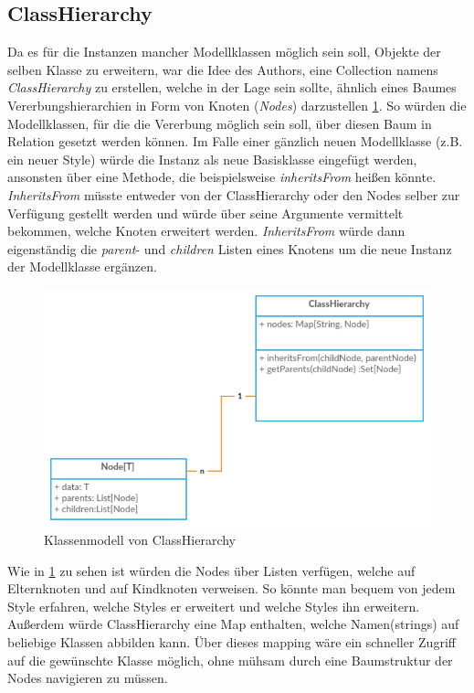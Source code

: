\subsection{ClassHierarchy}Da es für die Instanzen mancher Modellklassen möglich sein soll, Objekte der selben Klasse zu erweitern, war die Idee des Authors, eine Collection namens \textit{ClassHierarchy} zu erstellen, welche in der Lage sein sollte, ähnlich eines Baumes Vererbungshierarchien in Form von Knoten (\textit{Nodes}) darzustellen  \ref{classhierarchy}. So würden die Modellklassen, für die die Vererbung möglich sein soll, über diesen Baum in Relation gesetzt werden können. Im Falle einer gänzlich neuen Modellklasse (z.B. ein neuer Style) würde die Instanz als neue Basisklasse eingefügt werden, ansonsten über eine Methode, die beispielsweise \textit{inheritsFrom} heißen könnte. \textit{InheritsFrom} müsste entweder von der ClassHierarchy oder den Nodes selber zur Verfügung gestellt werden und würde über seine Argumente vermittelt bekommen, welche Knoten erweitert werden. \textit{InheritsFrom} würde dann eigenständig die \textit{parent}- und \textit{children} Listen eines Knotens um die neue Instanz der Modellklasse ergänzen.
\begin{figure}[H]
\begin{center}
\includegraphics[scale = 0.7]{Bilder/classhierarchy.pdf}
\caption{Klassenmodell von ClassHierarchy}
\label{classhierarchy}
\end{center}
\end{figure}Wie in \ref{classhierarchy} zu sehen ist würden die Nodes über Listen verfügen, welche auf Elternknoten und auf Kindknoten verweisen. So könnte man bequem von jedem Style erfahren, welche Styles er erweitert und welche Styles ihn erweitern. Außerdem würde ClassHierarchy eine Map enthalten, welche Namen(strings) auf beliebige Klassen abbilden kann. Über dieses mapping wäre ein schneller Zugriff auf die gewünschte Klasse möglich, ohne mühsam durch eine Baumstruktur der Nodes navigieren zu müssen.
